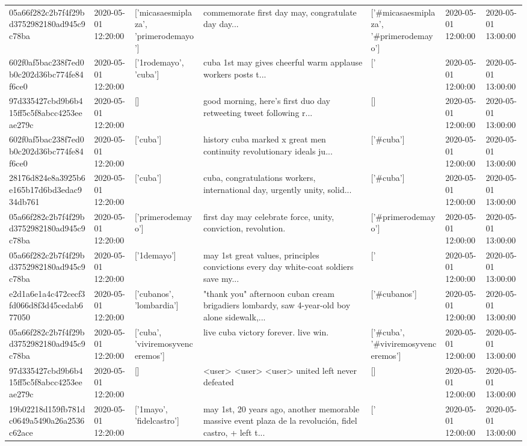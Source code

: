 \begin{tabular}{lllllll}
05a66f282c2b7f4f29bd3752982180ad945c9c78ba & 2020-05-01 12:20:00 & ['micasaesmiplaza', 'primerodemayo'] & commemorate first day may, congratulate day day... & ['#micasaesmiplaza', '#primerodemayo'] & 2020-05-01 12:00:00 & 2020-05-01 13:00:00 \\
602f0af5bac238f7ed0b0c202d36bc774fe84f6ce0 & 2020-05-01 12:20:00 & ['1rodemayo', 'cuba'] & cuba 1st may gives cheerful warm applause workers posts t... & ['#1rodemayo', '#cuba'] & 2020-05-01 12:00:00 & 2020-05-01 13:00:00 \\
97d335427cbd9b6b415ff5c5f8abcc4253eeae279c & 2020-05-01 12:20:00 & [] & good morning, here's first duo day retweeting tweet following r... & [] & 2020-05-01 12:00:00 & 2020-05-01 13:00:00 \\
602f0af5bac238f7ed0b0c202d36bc774fe84f6ce0 & 2020-05-01 12:20:00 & ['cuba'] & history cuba marked x great men continuity revolutionary ideals ju... & ['#cuba'] & 2020-05-01 12:00:00 & 2020-05-01 13:00:00 \\
28176d824e8a3925b6e165b17d6bd3edac934db761 & 2020-05-01 12:20:00 & ['cuba'] & cuba, congratulations workers, international day, urgently unity, solid... & ['#cuba'] & 2020-05-01 12:00:00 & 2020-05-01 13:00:00 \\
05a66f282c2b7f4f29bd3752982180ad945c9c78ba & 2020-05-01 12:20:00 & ['primerodemayo'] & first day may celebrate force, unity, conviction, revolution. & ['#primerodemayo'] & 2020-05-01 12:00:00 & 2020-05-01 13:00:00 \\
05a66f282c2b7f4f29bd3752982180ad945c9c78ba & 2020-05-01 12:20:00 & ['1demayo'] & may 1st great values, principles convictions every day white-coat soldiers save my... & ['#1demayo'] & 2020-05-01 12:00:00 & 2020-05-01 13:00:00 \\
e2d1a6e1a4c472cecf3fd066d8f3d45cedab677050 & 2020-05-01 12:20:00 & ['cubanos', 'lombardia'] & "thank you" afternoon cuban cream brigadiers lombardy, saw 4-year-old boy alone sidewalk,... & ['#cubanos'] & 2020-05-01 12:00:00 & 2020-05-01 13:00:00 \\
05a66f282c2b7f4f29bd3752982180ad945c9c78ba & 2020-05-01 12:20:00 & ['cuba', 'viviremosyvenceremos'] & live cuba victory forever. live win. & ['#cuba', '#viviremosyvenceremos'] & 2020-05-01 12:00:00 & 2020-05-01 13:00:00 \\
97d335427cbd9b6b415ff5c5f8abcc4253eeae279c & 2020-05-01 12:20:00 & [] & <user> <user> <user> united left never defeated 💪💪💪 & [] & 2020-05-01 12:00:00 & 2020-05-01 13:00:00 \\
19b02218d159fb781dc0649a5490a26a2536c62ace & 2020-05-01 12:20:00 & ['1mayo', 'fidelcastro'] & may 1st, 20 years ago, another memorable massive event plaza de la revolución, fidel castro, + left t... & ['#1mayo', '#fidelcastro'] & 2020-05-01 12:00:00 & 2020-05-01 13:00:00 \\

\end{tabular}
